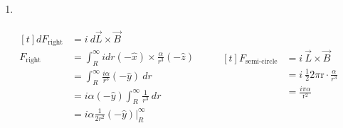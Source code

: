 \documentclass[11pt]{article}
\begin{document}
\newpage
\begin{enumerate}
\item 
\end{enumerate}
\begin{align*}
\begin{aligned}[t]
dF_{\mathrm{right}} &= i \ d \vec{L} \times \vec{B} \\
 F_{\mathrm{right}} &= \int^{\infty}_{R} i dr (-\hat{x}) \times \frac{\alpha}{r^{3}}(-\hat{z}) \\
 &= \int^{\infty}_{R} \frac{i \alpha}{ r^{3}} (-\hat{y}) \ dr \\
 &= i \alpha (-\hat{y}) \int^{\infty}_{R} \frac{1}{ r^{3}} \ dr \\
 &= i \alpha \frac{1}{2r^2} (-\hat{y}) \bigg|^{\infty}_{R}
\end{aligned}
\qquad
\begin{aligned}[t]
F_{\mathrm{semi\text{-}circle}} &= i \ \vec{L} \times \vec{B} \\
&= i \ \frac{1}{2} 2 \pi \mathrm{r} \cdot \frac{\alpha}{r^3} \\
&= \frac{i \pi \alpha}{\mathrm{r}^2} \\
\end{aligned}
\end{align*}
\end{document}
